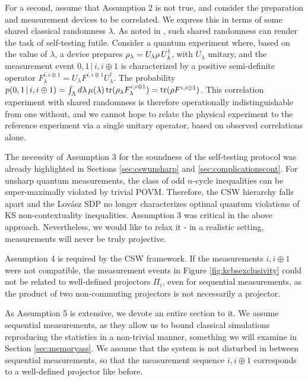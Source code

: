 For a second, assume that Assumption 2 is not true, and consider the preparation and  measurement devices to be correlated. We express this in terms of some shared classical randomness $\lambda$. As noted in \cite{Miklin2020}, such shared randomness can render the task of self-testing futile. Consider a quantum experiment where, based on the value of $\lambda$, a device prepares $\rho_\lambda=U_\lambda \rho \thinspace U_\lambda^{\dag}$, with $U_\lambda$ unitary, and the measurement event $0,1 \,\vert\, i, i\oplus 1$ is characterized by a positive semi-definite operator $F_\lambda^{i,i\oplus 1}=U_\lambda F^{i,i\oplus 1} U_\lambda^{\dag}$. The probability $p(0,1 \thinspace \vert \thinspace i,i\oplus 1)=\int_{\Lambda} d\lambda\thinspace\mu(\lambda)\operatorname{tr}(\rho_\lambda F_\lambda^{i,i\oplus 1})=\operatorname{tr}(\rho F^{i,i\oplus 1})$. This correlation experiment with shared randomness is therefore operationally indistinguishable from one without, and we cannot hope to relate the physical experiment to the reference experiment via a single unitary operator, based on observed correlations alone.

The necessity of Assumption 3 for the soundness of the self-testing protocol was already highlighted in Sections \ref{sec:cswunsharp} and \ref{sec:complicationscont}. For unsharp quantum measurements, the class of odd $n$-cycle inequalities can be super-maximally violated by trivial POVM. Therefore, the CSW hierarchy falls apart and the Lovász SDP no longer characterizes optimal quantum violations of KS non-contextuality inequalities. Assumption 3 was critical in the above approach. Nevertheless, we would like to relax it - in a realistic setting, measurements will never be truly projective.

Assumption 4 is required by the CSW framework. If the measurements $i,i\oplus 1$ were not compatible, the measurement events in Figure \ref{fig:kcbsexclusivity} could not be related to well-defined projectors $\Pi_i$, even for sequential measurements, as the product of two non-commuting projectors is not necessarily a projector.

As Assumption 5 is extensive, we devote an entire section to it. We assume sequential measurements, as they allow us to bound classical simulations reproducing the statistics in a non-trivial manner, something we will examine in Section \ref{sec:memoryass}. We assume that the system is not disturbed in between sequential measurements, so that the measurement sequence $i,i\oplus 1$ corresponds to a well-defined projector like before.

